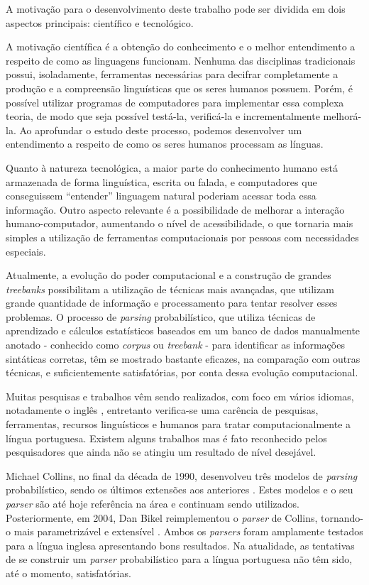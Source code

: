 A motivação para o desenvolvimento deste trabalho pode ser dividida em dois aspectos principais: científico e tecnológico.

A motivação científica é a obtenção do conhecimento e o melhor entendimento a respeito de como as linguagens funcionam. Nenhuma das disciplinas tradicionais possui, isoladamente, ferramentas necessárias para decifrar completamente a produção e a compreensão linguísticas que os seres humanos possuem. Porém, é possível utilizar programas de computadores para implementar essa complexa teoria, de modo que seja possível testá-la, verificá-la e incrementalmente melhorá-la. Ao aprofundar o estudo deste processo, podemos desenvolver um entendimento a respeito de como os seres humanos processam as línguas.

Quanto à natureza tecnológica, a maior parte do conhecimento humano está armazenada de forma linguística, escrita ou falada, e computadores que conseguissem ``entender'' linguagem natural poderiam acessar toda essa informação. Outro aspecto relevante é a possibilidade de melhorar a interação humano-computador, aumentando o nível de acessibilidade, o que tornaria mais simples a utilização de ferramentas computacionais por pessoas com necessidades especiais.

Atualmente, a evolução do poder computacional e a construção de grandes \emph{treebanks} possibilitam a utilização de técnicas mais avançadas, que utilizam grande quantidade de informação e processamento para tentar resolver esses problemas. O processo de \emph{parsing} probabilístico, que utiliza técnicas de aprendizado e cálculos estatísticos baseados em um banco de dados manualmente anotado - conhecido como \emph{corpus} ou \emph{treebank} - para identificar as informações sintáticas corretas, têm se mostrado bastante eficazes, na comparação com outras técnicas, e suficientemente satisfatórias, por conta dessa evolução computacional.

Muitas pesquisas e trabalhos vêm sendo realizados, com foco em vários idiomas, notadamente o inglês \cite{prolo03,charniak97,collins97}, entretanto verifica-se uma carência de pesquisas, ferramentas, recursos linguísticos e humanos para tratar computacionalmente a língua portuguesa.
Existem alguns trabalhos \cite{baldridge06,bick00,bonfante03} mas é fato reconhecido pelos pesquisadores que ainda não se atingiu um resultado de nível desejável.

Michael Collins, no final da década de 1990, desenvolveu três modelos de \emph{parsing} probabilístico, sendo os últimos extensões aos anteriores \cite{collins97,collins99}. Estes modelos e o seu \emph{parser} são até hoje referência na área e continuam sendo utilizados. Posteriormente, em 2004, Dan Bikel reimplementou o \emph{parser} de Collins, tornando-o mais parametrizável e extensível \cite{bikel04}. Ambos os \emph{parsers} foram amplamente testados para a língua inglesa apresentando bons resultados. Na atualidade, as tentativas de se construir um \emph{parser} probabilístico para a língua portuguesa não têm sido, até o momento, satisfatórias.



